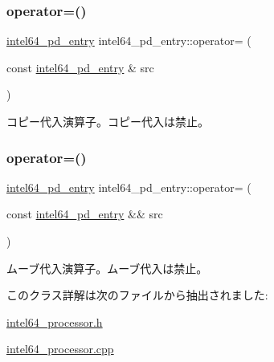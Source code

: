 \subsubsection{\texorpdfstring{operator=()}{operator=()}\hspace{0.1cm}{\footnotesize\ttfamily [1/2]}}
{\footnotesize\ttfamily \hyperlink{classintel64__pd__entry}{intel64\+\_\+pd\+\_\+entry} intel64\+\_\+pd\+\_\+entry\+::operator= (\begin{DoxyParamCaption}\item[{const \hyperlink{classintel64__pd__entry}{intel64\+\_\+pd\+\_\+entry} \&}]{src }\end{DoxyParamCaption})\hspace{0.3cm}{\ttfamily [delete]}}

コピー代入演算子。コピー代入は禁止。 \hypertarget{classintel64__pd__entry_a7c1b852616a6ae19011ba5ab8d3723ed}{}\label{classintel64__pd__entry_a7c1b852616a6ae19011ba5ab8d3723ed} 
\subsubsection{\texorpdfstring{operator=()}{operator=()}\hspace{0.1cm}{\footnotesize\ttfamily [2/2]}}
{\footnotesize\ttfamily \hyperlink{classintel64__pd__entry}{intel64\+\_\+pd\+\_\+entry} intel64\+\_\+pd\+\_\+entry\+::operator= (\begin{DoxyParamCaption}\item[{const \hyperlink{classintel64__pd__entry}{intel64\+\_\+pd\+\_\+entry} \&\&}]{src }\end{DoxyParamCaption})\hspace{0.3cm}{\ttfamily [delete]}}

ムーブ代入演算子。ムーブ代入は禁止。 

このクラス詳解は次のファイルから抽出されました\+:\begin{DoxyCompactItemize}
\item 
\hyperlink{intel64__processor_8h}{intel64\+\_\+processor.\+h}\item 
\hyperlink{intel64__processor_8cpp}{intel64\+\_\+processor.\+cpp}\end{DoxyCompactItemize}
